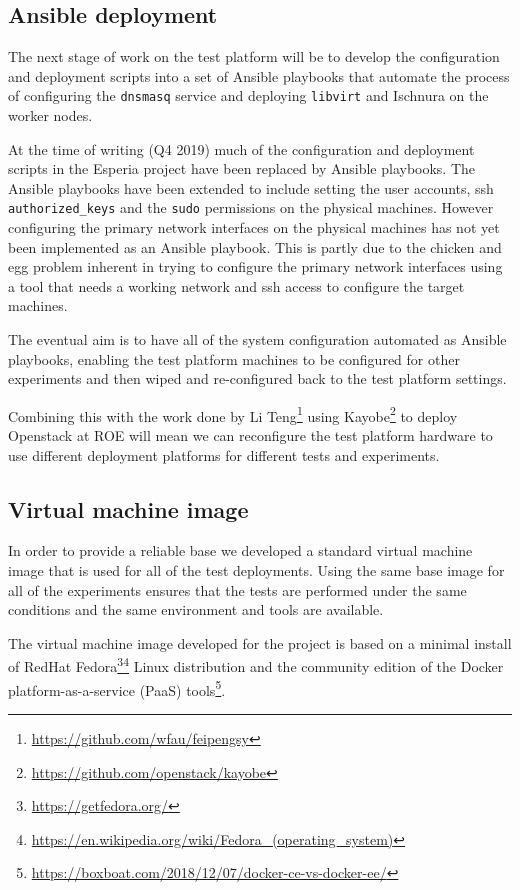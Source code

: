 \documentclass{article}
\newcommand{\ansible} {Ansible\xspace}
\newcommand{\docker} {Docker\xspace}
\newcommand{\openstack} {Openstack\xspace}
\newcommand{\dnsmasq} {\texttt{dnsmasq}\xspace}
\newcommand{\ischnura} {Ischnura\xspace}
\newcommand{\esperia} {Esperia\xspace}
\newcommand{\libvirt} {\texttt{libvirt}\xspace}
\newcommand{\paas} {PaaS\xspace}
\newcommand{\redhat} {RedHat\xspace}
\newcommand{\fedora} {Fedora\xspace}
\newcommand{\roe} {ROE\xspace}
\newcommand{\testplatform} {test platform\xspace}
\newcommand{\footurl}[1] {\footnote{\url{#1}}}
\begin{document}
\subsection{Ansible deployment}
\label{deployment-testbed.ansible}

The next stage of work on the \testplatform will be to develop the configuration and deployment scripts into a set of \ansible playbooks that automate the process of configuring the \dnsmasq service and deploying \libvirt and \ischnura on the worker nodes.

At the time of writing (Q4 2019) much of the configuration and deployment scripts in the \esperia project have been replaced by \ansible playbooks.
The \ansible playbooks have been extended to include setting the user accounts, ssh \texttt{authorized\_keys} and the \texttt{sudo} permissions on the physical machines. However configuring the primary network interfaces on the physical machines has not yet been implemented as an \ansible playbook. This is partly due to the chicken and egg problem inherent in trying to configure the primary network interfaces using a tool that needs a working network and ssh access to configure the target machines.

The eventual aim is to have all of the system configuration automated as \ansible playbooks, enabling the \testplatform machines to be configured for other experiments and then wiped and re-configured back to the \testplatform settings.

Combining this with the work done by Li Teng\footurl{https://github.com/wfau/feipengsy} using Kayobe\footurl{https://github.com/openstack/kayobe} to deploy \openstack at \roe will mean we can reconfigure the \testplatform hardware to use different deployment platforms for different tests and experiments.

\subsection{Virtual machine image}
\label{deployment-vm-image}

In order to provide a reliable base we developed a standard virtual machine image that is used for all of the test deployments.
Using the same base image for all of the experiments ensures that the tests are performed under the same conditions and the same environment and tools are available.

The virtual machine image developed for the project is based on a minimal install of \redhat \fedora\footurl{https://getfedora.org/}\footurl{https://en.wikipedia.org/wiki/Fedora_(operating_system)} Linux distribution and the community edition of the \docker platform-as-a-service (\paas) tools\footurl{https://boxboat.com/2018/12/07/docker-ce-vs-docker-ee/}.
\end{document}

